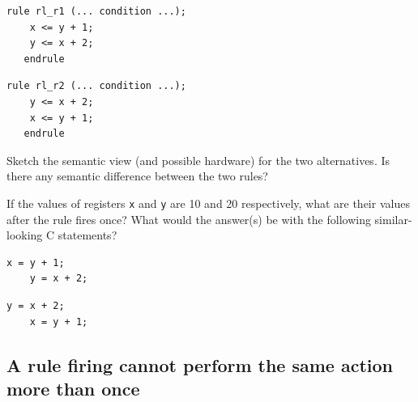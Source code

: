 \begin{center}
\begin{minipage}{2.5in}
 {\small
 \begin{Verbatim}[frame=single, label=BSV]
   rule rl_r1 (... condition ...);
    x <= y + 1;
    y <= x + 2;
   endrule
 \end{Verbatim}
 }
\end{minipage}
\hmm
\begin{minipage}{2.5in}
 {\small
 \begin{Verbatim}[frame=single,label=BSV]
   rule rl_r2 (... condition ...);
    y <= x + 2;
    x <= y + 1;
   endrule
 \end{Verbatim}
 }
\end{minipage}
\end{center}

\vspace{1ex}

Sketch the semantic view (and possible hardware) for the two
alternatives.  Is there any semantic difference between the two rules?

\vspace{1ex}

If the values of registers \verb|x| and \verb|y| are 10 and 20
respectively, what are their values after the rule fires once?  What
would the answer(s) be with the following similar-looking C
statements?

\begin{center}
\begin{minipage}{2.5in}
 {\small
 \begin{Verbatim}[frame=single, label=C]
    x = y + 1;
    y = x + 2;
 \end{Verbatim}
 }
\end{minipage}
\hmm
\begin{minipage}{2.5in}
 {\small
 \begin{Verbatim}[frame=single, label=C]
    y = x + 2;
    x = y + 1;
 \end{Verbatim}
 }
\end{minipage}
\end{center}

\Endexercise


\subsection{A rule firing cannot perform the same action more than once}

